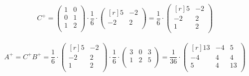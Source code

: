 \[C^+ = \begin{pmatrix}
1 & 0 \\         
0 & 1 \\
1 & 2 \\
\end{pmatrix} \cdot \frac{1}{6} \cdot \begin{pmatrix}[r]
5 & -2 \\         
-2 & 2 \\
\end{pmatrix} = \frac{1}{6} \cdot \begin{pmatrix}[r]
5 & -2 \\         
-2 & 2 \\
1 & 2 \\
\end{pmatrix}\]\\
\[A^+ = C^+B^+ = \frac{1}{6} \cdot \begin{pmatrix}[r]
5 & -2 \\         
-2 & 2 \\
1 & 2 \\
\end{pmatrix} \cdot \frac{1}{6} \cdot \begin{pmatrix}
3 & 0 & 3 \\         
1 & 2 & 5 \\
\end{pmatrix} = \frac{1}{36} \cdot \begin{pmatrix}[r]
13 & -4 & 5 \\         
-4 & 4 & 4 \\
5 & 4 & 13 \\
\end{pmatrix}\]
